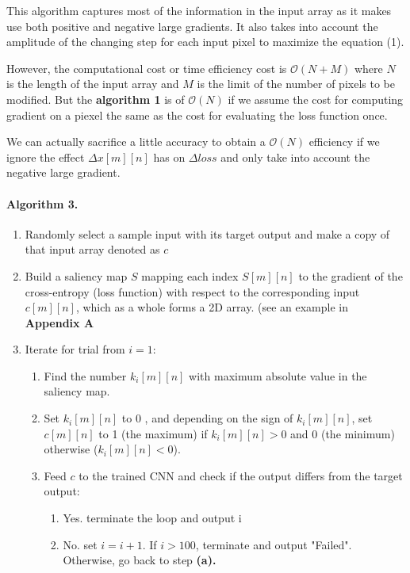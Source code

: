 \documentclass{article}
\begin{document}
This algorithm captures most of the information in the input array as it makes use both positive and negative large gradients. It also takes into account the amplitude of the changing step for each input pixel to maximize the equation (1).

However, the computational cost or time efficiency cost is $\mathcal{O}(N+M)$ where $N$ is the length of the input array and $M$ is the limit of the number of pixels to be modified. 
But the \textbf{algorithm 1} is of $\mathcal{O}(N)$ if we assume the cost for computing gradient on a piexel the same as the cost for evaluating the loss function once.

We can actually sacrifice a little accuracy to obtain a $\mathcal{O}(N)$ efficiency if we ignore the effect $\Delta x[m][n]$ has on $\Delta loss$ and only take into account the negative large gradient.

\paragraph{Algorithm 3.}
\begin{enumerate}
\item Randomly select a sample input with its target output and make a copy of that input array denoted as $c$

\item Build a saliency map $S$ mapping each index $S[m][n]$ to the gradient of the cross-entropy (loss function) with respect to the corresponding input $c[m][n]$, which as a whole forms a 2D array. (see an example in \textbf{Appendix A}

\item Iterate for trial from $i=1$:

\begin{enumerate}
	\item Find the number $k_i[m][n]$ with maximum absolute value in the saliency map.

	\item Set $k_i[m][n]$ to 0 , and depending on the sign of $k_i[m][n]$, set $c[m][n]$ to 1 (the maximum) if $k_i[m][n] > 0$ and 0 (the minimum) otherwise ($k_i[m][n] < 0$).

	\item Feed $c$ to the trained CNN and check if the output differs from the target output:
		\begin{enumerate}
			\item Yes. terminate the loop and output i
			\item No. set $i=i+1$. If $i > 100$, terminate and output "Failed". Otherwise, go back to step \textbf{(a).}
		\end{enumerate}
\end{enumerate}
\end{enumerate}
\end{document}

